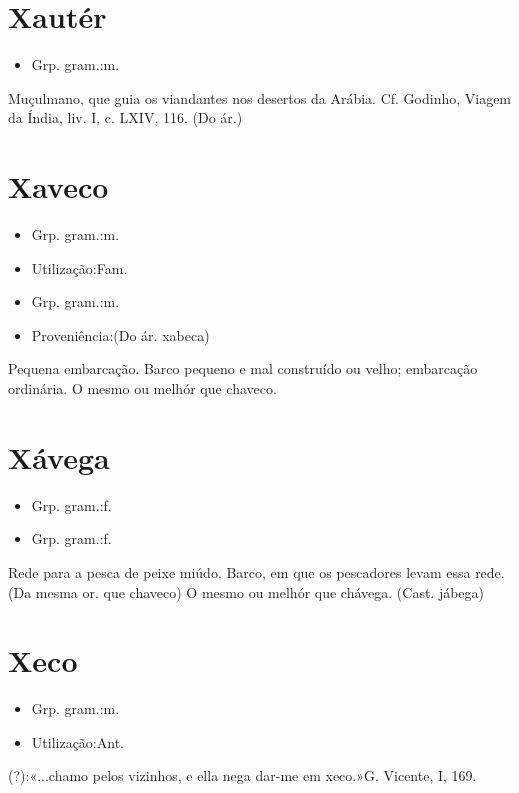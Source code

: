\section{Xautér}
\begin{itemize}
\item {Grp. gram.:m.}
\end{itemize}
Muçulmano, que guia os viandantes nos desertos da Arábia. Cf. Godinho, \textunderscore Viagem da Índia\textunderscore , liv. I, c. LXIV, 116.
(Do ár.)
\section{Xaveco}
\begin{itemize}
\item {Grp. gram.:m.}
\end{itemize}
\begin{itemize}
\item {Utilização:Fam.}
\end{itemize}
\begin{itemize}
\item {Grp. gram.:m.}
\end{itemize}
\begin{itemize}
\item {Proveniência:(Do ár. \textunderscore xabeca\textunderscore )}
\end{itemize}
Pequena embarcação.
Barco pequeno e mal construído ou velho; embarcação ordinária.
O mesmo ou melhór que \textunderscore chaveco\textunderscore .
\section{Xávega}
\begin{itemize}
\item {Grp. gram.:f.}
\end{itemize}
\begin{itemize}
\item {Grp. gram.:f.}
\end{itemize}
Rede para a pesca de peixe miúdo.
Barco, em que os pescadores levam essa rede.
(Da mesma or. que \textunderscore chaveco\textunderscore )
O mesmo ou melhór que \textunderscore chávega\textunderscore .
(Cast. \textunderscore jábega\textunderscore )
\section{Xeco}
\begin{itemize}
\item {Grp. gram.:m.}
\end{itemize}
\begin{itemize}
\item {Utilização:Ant.}
\end{itemize}
(?):«\textunderscore ...chamo pelos vizinhos, e ella nega dar-me em xeco.\textunderscore »G. Vicente, I, 169.
